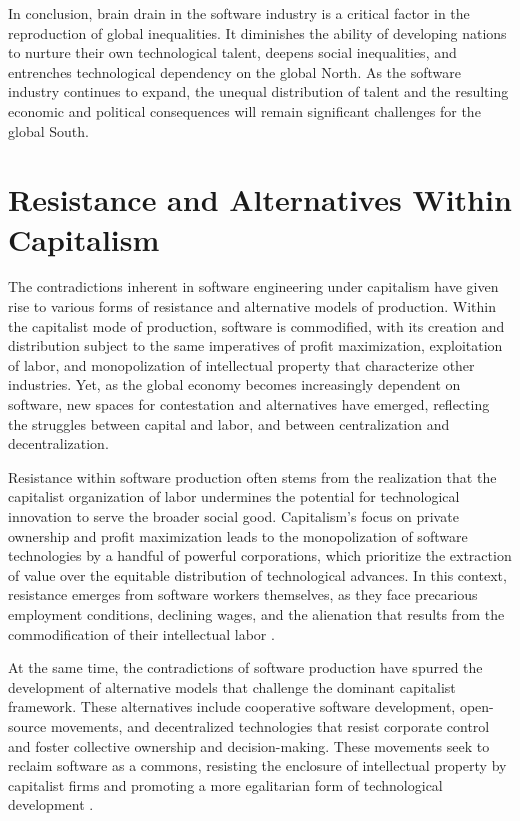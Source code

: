 In conclusion, brain drain in the software industry is a critical factor in the reproduction of global inequalities. It diminishes the ability of developing nations to nurture their own technological talent, deepens social inequalities, and entrenches technological dependency on the global North. As the software industry continues to expand, the unequal distribution of talent and the resulting economic and political consequences will remain significant challenges for the global South.

\section{Resistance and Alternatives Within Capitalism}

The contradictions inherent in software engineering under capitalism have given rise to various forms of resistance and alternative models of production. Within the capitalist mode of production, software is commodified, with its creation and distribution subject to the same imperatives of profit maximization, exploitation of labor, and monopolization of intellectual property that characterize other industries. Yet, as the global economy becomes increasingly dependent on software, new spaces for contestation and alternatives have emerged, reflecting the struggles between capital and labor, and between centralization and decentralization.

Resistance within software production often stems from the realization that the capitalist organization of labor undermines the potential for technological innovation to serve the broader social good. Capitalism's focus on private ownership and profit maximization leads to the monopolization of software technologies by a handful of powerful corporations, which prioritize the extraction of value over the equitable distribution of technological advances. In this context, resistance emerges from software workers themselves, as they face precarious employment conditions, declining wages, and the alienation that results from the commodification of their intellectual labor \cite[pp.~45-47]{cleaver2000}.

At the same time, the contradictions of software production have spurred the development of alternative models that challenge the dominant capitalist framework. These alternatives include cooperative software development, open-source movements, and decentralized technologies that resist corporate control and foster collective ownership and decision-making. These movements seek to reclaim software as a commons, resisting the enclosure of intellectual property by capitalist firms and promoting a more egalitarian form of technological development \cite[pp.~83-86]{kling1996}.

